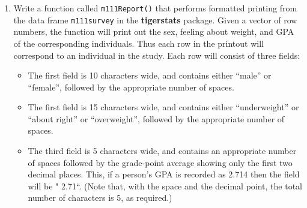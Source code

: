 \documentclass[]{book}
\makeatletter
\newenvironment{Shaded}{\begin{snugshade}}{\end{snugshade}}
\newcommand{\KeywordTok}[1]{\textcolor[rgb]{0.13,0.29,0.53}{\textbf{{#1}}}}
\newcommand{\DecValTok}[1]{\textcolor[rgb]{0.00,0.00,0.81}{{#1}}}
\newcommand{\StringTok}[1]{\textcolor[rgb]{0.31,0.60,0.02}{{#1}}}
\newcommand{\NormalTok}[1]{{#1}}
\providecommand{\tightlist}{%
  \setlength{\itemsep}{0pt}\setlength{\parskip}{0pt}}
\newenvironment{kframe}{%
\medskip{}
\setlength{\fboxsep}{.8em}
 \def\at@end@of@kframe{}%
 \ifinner\ifhmode%
  \def\at@end@of@kframe{\end{minipage}}%
  \begin{minipage}{\columnwidth}%
 \fi\fi%
 \def\FrameCommand##1{\hskip\@totalleftmargin \hskip-\fboxsep
 \colorbox{shadecolor}{##1}\hskip-\fboxsep
     \hskip-\linewidth \hskip-\@totalleftmargin \hskip\columnwidth}%
 \MakeFramed {\advance\hsize-\width
   \@totalleftmargin\z@ \linewidth\hsize
   \@setminipage}}%
 {\par\unskip\endMakeFramed%
 \at@end@of@kframe}
\renewenvironment{Shaded}{\begin{kframe}}{\end{kframe}}
\theoremstyle{definition}
\theoremstyle{definition}
\theoremstyle{remark}
\makeatother
\begin{document}
{\begin{enumerate}
\begin{Shaded}
\begin{Highlighting}[]
\KeywordTok{subPalindrome}\NormalTok{(}\StringTok{"yabbadabbadoo!"}\NormalTok{, }\DecValTok{2}\NormalTok{)}
\end{Highlighting}
\end{Shaded}

\begin{verbatim}
##  [1] "abbadabba" "bbadabb"   "dabbad"    "badab"     "abba"     
##  [6] "abba"      "ada"       "bb"        "bb"        "oo"
\end{verbatim}

\begin{Shaded}
\begin{Highlighting}[]
\KeywordTok{subPalindrome}\NormalTok{(}\StringTok{"yabbadabbadoo!"}\NormalTok{, }\DecValTok{10}\NormalTok{)}
\end{Highlighting}
\end{Shaded}

\begin{verbatim}
## character(0)
\end{verbatim}

\begin{Shaded}
\begin{Highlighting}[]
\KeywordTok{subPalindrome}\NormalTok{(}\StringTok{"yabbadabbadoo!"}\NormalTok{, }\DecValTok{0}\NormalTok{)}
\end{Highlighting}
\end{Shaded}

\begin{verbatim}
## n should be at least 1 and no more than the number
## of characters in str.
\end{verbatim}
\item
  Write a function called \texttt{m111Report()} that performs formatted
  printing from the data frame \texttt{m111survey} in the
  \textbf{tigerstats} package. Given a vector of row numbers, the
  function will print out the sex, feeling about weight, and GPA of the
  corresponding individuals. Thus each row in the printout will
  correspond to an individual in the study. Each row will consist of
  three fields:

  \begin{itemize}
  \tightlist
  \item
    The first field is 10 characters wide, and contains either ``male''
    or ``female'', followed by the appropriate number of spaces.
  \item
    The first field is 15 characters wide, and contains either
    ``underweight'' or ``about right'' or ``overweight'', followed by
    the appropriate number of spaces.
  \item
    The third field is 5 characters wide, and contains an appropriate
    number of spaces followed by the grade-point average showing only
    the first two decimal places. This, if a person's GPA is recorded as
    2.714 then the field will be " 2.71``. (Note that, with the space
    and the decimal point, the total number of characters is 5, as
    required.)
  \end{itemize}


\end{enumerate}}
\end{document}
